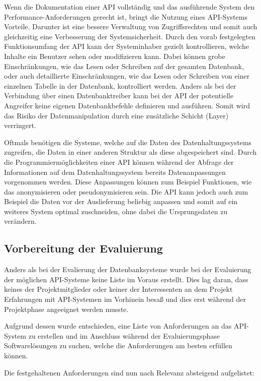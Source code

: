 Wenn die Dokumentation einer \gls{API} vollständig und das ausführende System
den Performance\hyp{}Anforderungen gerecht ist, bringt die Nutzung eines
\gls{API}\hyp{}Systems Vorteile. Darunter ist eine bessere Verwaltung von
Zugriffsrechten und somit auch gleichzeitig eine Verbesserung der
Systemsicherheit. Durch den vorab festgelegten Funktionsumfang der \gls{API}
kann der Systeminhaber gezielt kontrollieren, welche Inhalte ein Benutzer sehen
oder modifizieren kann. Dabei können grobe Einschränkungen, wie das Lesen oder
Schreiben auf der gesamten Datenbank, oder auch detaillierte Einschränkungen,
wie das Lesen oder Schreiben von einer einzelnen Tabelle in der Datenbank,
kontrolliert werden. Anders als bei der Verbindung über einen
\gls{Datenbanktreiber} kann bei der \gls{API} der potentielle Angreifer keine
eigenen Datenbankbefehle definieren und ausführen. Somit wird das Risiko der
Datenmanipulation durch eine zusätzliche Schicht (Layer) verringert.

Oftmals benötigen die Systeme, welche auf die Daten des Datenhaltungssystems
zugreifen, die Daten in einer anderen Struktur als diese abgespeichert sind.
Durch die Programmiermöglichkeiten einer \gls{API} können während der Abfrage
der Informationen auf dem Datenhaltungssystem bereits Datenanpassungen
vorgenommen werden. Diese Anpassungen können zum Beispiel Funktionen, wie das
anonymisieren oder pseudonymisieren sein. Die \gls{API} kann jedoch auch zum
Beispiel die Daten vor der Auslieferung beliebig anpassen und somit auf ein
weiteres System optimal zuschneiden, ohne dabei die Ursprungsdaten zu verändern.
\nl%

\subsection{Vorbereitung der Evaluierung}
\label{subsec:api_vorbereitung_der_evaluierung}
Anders als bei der Evalierung der Datenbanksysteme wurde bei der Evaluierung
der möglichen \gls{API}\hyp{}Systeme keine Liste im Voraus erstellt. Dies lag
daran, dass keines der Projektmitglieder oder keiner der Interessenten an dem
Projekt Erfahrungen mit \gls{API}\hyp{}Systemen im Vorhinein besaß und dies
erst während der Projektphase angeeignet werden musste.

Aufgrund dessen wurde entschieden, eine Liste von Anforderungen an das
\gls{API}\hyp{}System zu erstellen und im Anschluss während der
Evaluierungsphase Softwarelösungen zu suchen, welche die Anforderungen am
besten erfüllen können.

Die festgehaltenen Anforderungen sind nun nach Relevanz absteigend aufgelistet:


